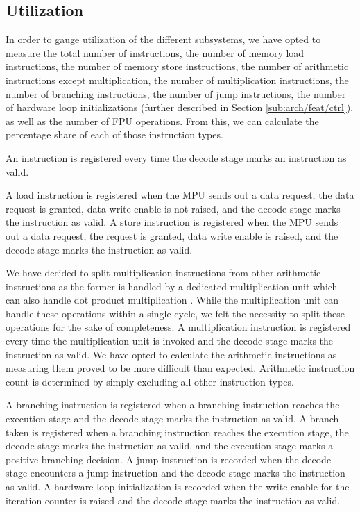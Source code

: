 \documentclass[../bachelor_paper.tex]{subfiles}
\begin{document}
\subsection{Utilization}
    \label{sub:arch/feat/ut}
In order to gauge utilization of the different subsystems, we have opted to measure the total number of instructions, the number of memory load instructions, the number of memory store instructions, the number of arithmetic instructions except multiplication, the number of multiplication instructions, the number of branching instructions, the number of jump instructions, the number of hardware loop initializations (further described in Section \ref{sub:arch/feat/ctrl}), as well as the number of \ac{FPU} operations. From this, we can calculate the percentage share of each of those instruction types.

An instruction is registered every time the decode stage marks an instruction as valid.

A load instruction is registered when the \ac{MPU}  sends out a data request, the data request is granted, data write enable is not raised, and the decode stage marks the instruction as valid. A store instruction is registered when the \ac{MPU} sends out a data request, the request is granted, data write enable is raised, and the decode stage marks the instruction as valid.

We have decided to split multiplication instructions from other arithmetic instructions as the former is handled by a dedicated multiplication unit which can also handle dot product multiplication \cite{gautschiNearThresholdRISCVCore2017}. While the multiplication unit can handle these operations within a single cycle, we felt the necessity to split these operations for the sake of completeness. A multiplication instruction is registered every time the multiplication unit is invoked and the decode stage marks the instruction as valid. We have opted to calculate the arithmetic instructions as measuring them proved to be more difficult than expected. Arithmetic instruction count is determined by simply excluding all other instruction types.

A branching instruction is registered when a branching instruction reaches the execution stage and the decode stage marks the instruction as valid. A branch taken is registered when a branching instruction reaches the execution stage, the decode stage marks the instruction as valid, and the execution stage marks a positive branching decision. A jump instruction is recorded when the decode stage encounters a jump instruction and the decode stage marks the instruction as valid. A hardware loop initialization is recorded when the write enable for the iteration counter is raised and the decode stage marks the instruction as valid. 
\end{document}
